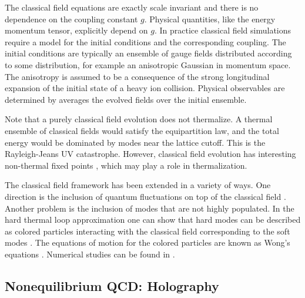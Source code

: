  The classical field equations are exactly scale invariant and there 
is no dependence on the coupling constant $g$. Physical quantities,
like the energy momentum tensor, explicitly depend on $g$. In practice
classical field simulations require a model for the initial conditions
and the corresponding coupling. The initial conditions are typically
an ensemble of gauge fields distributed according to some distribution, 
for example an anisotropic Gaussian in momentum space. The anisotropy 
is assumed to be a consequence of the strong longitudinal expansion of 
the initial state of a heavy ion collision. Physical observables are
determined by averages the evolved fields over the initial ensemble.

 Note that a purely classical field evolution does not thermalize. 
A thermal ensemble of classical fields would satisfy the equipartition
law, and the total energy would be dominated by modes near the 
lattice cutoff. This is the Rayleigh-Jeans UV catastrophe. However,
classical field evolution has interesting non-thermal fixed points
\cite{Berges:2008wm}, which may play a role in thermalization. 

 The classical field framework has been extended in a variety
of ways. One direction is the inclusion of quantum fluctuations
on top of the classical field \cite{Dusling:2010rm}. Another problem
is the inclusion of modes that are not highly populated. In the hard
thermal loop approximation one can show that hard modes can be described
as colored particles interacting with the classical field corresponding 
to the soft modes \cite{Litim:2001db}. The equations of motion for the 
colored particles are known as Wong's equations \cite{Wong:1970fu}. 
Numerical studies can be found in \cite{Hu:1996sf}.


\subsection{Nonequilibrium QCD: Holography}
\label{sec_ads}
 

